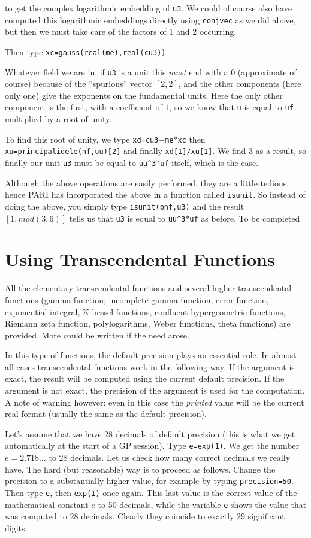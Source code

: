 to get the complex logarithmic embedding of {\tt u3}.
We could of course also have computed this logarithmic embeddings directly 
using {\tt conjvec} as we did above, but then we must take care of the factors
of 1 and 2 occurring.

Then type {\tt xc=gauss(real(me),real(cu3))}

Whatever field we are in, if {\tt u3} is a unit this {\it must} end with
a 0 (approximate of course)
because of the ``spurious'' vector $[2,2]$, and the other components (here
only one) give the exponents on the fundamental units. Here the only other
component is the first, with a coefficient of $1$, so we know that {\tt u}
is equal to {\tt uf} multiplied by a root of unity.

To find this root of unity, we type {\tt xd=cu3$-$me$*$xc} then
{\tt xu=principalidele(nf,uu)[2]} and finally {\tt xd[1]/xu[1]}. We find
$3$ as a result, so finally our unit {\tt u3} must be equal to 
{\tt uu\^{}3$*$uf} itself, which is the case.

Although the above operations are easily performed, they are a little tedious,
hence PARI has incorporated the above in a function called {\tt isunit}.
So instead of doing the above, you simply type {\tt isunit(bnf,u3)}
and the result $[1,mod(3,6)]$ tells us that {\tt u3} is equal to
{\tt uu\^{}3$*$uf} as before.
\medskip
To be completed
\medskip
\section{Using Transcendental Functions}
\medskip
All the elementary transcendental functions and several higher transcendental
functions (gam\-ma function, incomplete gamma function, error function, 
exponential integral, K-bessel functions, confluent hypergeometric functions, 
Riemann zeta function, polylogarithms, Weber functions, theta functions) are 
provided. More could be written if the need arose.

In this type of functions, the default precision plays an essential role.
In almost all cases transcendental functions work in the following way.
If the argument is exact, the result will be computed using the current
default precision. If the argument is not exact, the precision of the
argument is used for the computation. A note of warning however: even in this
case the {\it printed\/} value will be the current real format (usually the
same as the default precision). 

Let's assume that we have 28 decimals of default precision (this is what
we get automatically at the start of a GP session). Type {\tt e=exp(1)}.
We get the number $e=2.718\dots$ to 28 decimals. Let us check how many
correct decimals we really have. The hard (but reasonable) way is to proceed
as follows. Change the precision to a substantially higher value, for example
by typing {\tt\bs precision=50}. Then type {\tt e}, then {\tt exp(1)} once
again. This last value is the correct value of the mathematical constant $e$
to 50 decimals, while the variable {\tt e} shows the value that was
computed to 28 decimals. Clearly they coincide to exactly 29 significant
digits.

